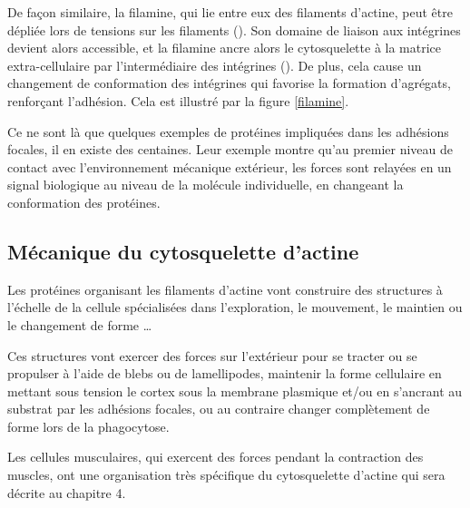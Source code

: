 De façon similaire, la filamine, qui lie entre eux des filaments d'actine, peut être dépliée lors de tensions sur les filaments  (\cite{furuike_mechanical_2001}). Son domaine de liaison aux intégrines devient alors accessible, et la filamine ancre alors le cytosquelette à la matrice extra-cellulaire par l'intermédiaire des intégrines (\cite{yamazaki_section:_2002}). De plus, cela cause un changement de conformation des intégrines qui favorise la formation d'agrégats, renforçant l'adhésion. Cela est illustré par la figure \ref{filamine}.

Ce ne sont là que quelques exemples de protéines impliquées dans les adhésions focales, il en existe des centaines. Leur exemple montre qu'au premier niveau de contact avec l'environnement mécanique extérieur, les forces sont relayées en un signal biologique au niveau de la molécule individuelle, en changeant la conformation des protéines. 

\subsection{Mécanique du cytosquelette d'actine}

Les protéines organisant les filaments d'actine vont construire des structures à l'échelle de la cellule spécialisées dans l'exploration, le mouvement, le maintien ou le changement de forme \dots

Ces structures vont exercer des forces sur l'extérieur pour se tracter ou se propulser à l'aide de blebs ou de lamellipodes, maintenir la forme cellulaire en mettant sous tension le cortex sous la membrane plasmique et/ou en s'ancrant au substrat par les adhésions focales, ou au contraire changer complètement de forme lors de la phagocytose. 

Les cellules musculaires, qui exercent des forces pendant la contraction des muscles, ont une organisation très spécifique du cytosquelette d'actine  qui sera décrite au chapitre 4. 
%
%

